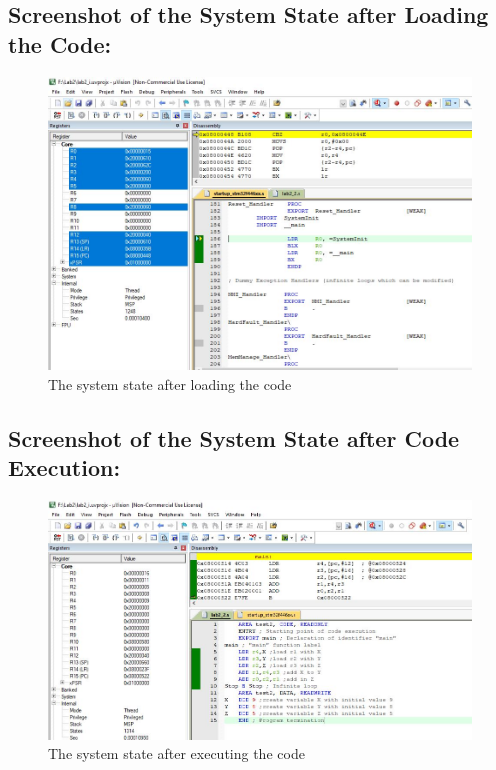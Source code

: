 \documentclass[12pt]{article}
\begin{document}
\subsection{Screenshot of the System State after Loading the Code:}
\begin{figure}[ht]
    \centering
    \includegraphics[scale=.7]{images/lab2_ss3.jpg}
    \caption{The system state after loading the code}
    \label{fig:before_task_two}
\end{figure}

\pagebreak

\subsection{Screenshot of the System State after Code Execution:}
\begin{figure}[ht]
    \centering
    \includegraphics[scale=.7]{images/lab2_ss4.jpg}
    \caption{The system state after executing the code}
    \label{fig:after_task_two}
\end{figure}
\end{document}
